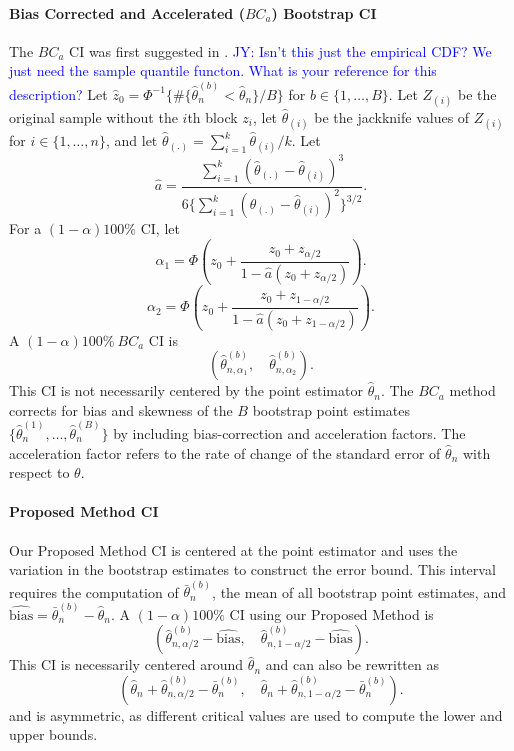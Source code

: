 \documentclass[12pt, letterpaper, titlepage]{article}
\newcommand{\jy}[1]{\textcolor{blue}{JY: #1}}
\begin{document}
\paragraph{Bias Corrected and Accelerated ($BC_a$) Bootstrap CI}
The $BC_a$ CI was first suggested in \citet{efron1987better}.
\jy{Isn't this just the empirical CDF? We just need the sample quantile functon.
  What is your reference for this description?}
Let $\hat{z}_0 = \Phi^{-1}\{\#\{\hat\theta_n^{(b)} < \hat{\theta}_n\} / B\}$
for $b \in \{1, \ldots, B\}$. 
Let $Z_{(i)}$ be the original sample without the $i$th block $z_i$, let
$\hat{\theta}_{(i)}$ be the jackknife values of $Z_{(i)}$
for $i \in \{1, \ldots, n\}$, 
and let $\hat{\theta}_{(.)} = \sum_{i=1}^{k} \hat{\theta}_{(i)} / k$. 
Let 
\[
\hat{a} = \frac{\sum_{i=1}^{k} (\hat{\theta}_{(.)} -
  \hat{\theta}_{(i)})^3}{6\{\sum_{i=1}^{k} (\hat{\theta}_{(.)} -
  \hat{\theta}_{(i)})^2\}^{3/2}}
.\] For a $(1 - \alpha)100\%$ CI, let
\[
\alpha_1 = \Phi\left(z_0 + \frac{z_{0} +
  z_{\alpha/2}}{1 - \hat{a}(z_{0} + z_{\alpha/2})}\right).
\]
\[
\alpha_2 = \Phi\left(z_0 + \frac{z_{0} +
  z_{1 - \alpha/2}}{1 - \hat{a}(z_{0} + z_{1 - \alpha/2})}\right).
\]
A $(1 - \alpha)100\%~BC_a$ CI is
\[
(\hat\theta_{n, \alpha_1}^{(b)}, \quad \hat\theta_{n, \alpha_2}^{(b)}).
\]
This CI is not necessarily centered by the point estimator $\hat\theta_n$. The
$BC_a$ method corrects for bias and skewness of the $B$ bootstrap point
estimates $\{\hat\theta_n^{(1)}, \ldots, \hat\theta_n^{(B)}\}$ by including
bias-correction and acceleration factors. The acceleration factor refers to
the 
rate of change of the standard error of $\hat\theta_n$ with respect to
$\theta$.

\paragraph{Proposed Method CI}
Our Proposed Method CI is centered at the point estimator and uses the
variation
in the bootstrap estimates to construct the error bound. This interval requires
the computation of $\bar\theta_n^{(b)}$, the mean of all bootstrap point
estimates, and $\widehat{\text{bias}} = \bar\theta_n^{(b)} - \hat\theta_n$.
A $(1 - \alpha)100\%$ CI using our Proposed Method is
\[
(\hat\theta_{n, \alpha/2}^{(b)} - \widehat{\text{bias}}, \quad
\hat\theta_{n, 1 - \alpha/2}^{(b)} - \widehat{\text{bias}}).
\]
This CI is necessarily centered around $\hat\theta_n$ and can also be rewritten
as 
\[
(\hat\theta_n + \hat\theta_{n, \alpha/2}^{(b)} - \bar\theta_n^{(b)}, \quad
\hat\theta_n + \hat\theta_{n, 1 - \alpha/2}^{(b)} - \bar\theta_n^{(b)}).
\]
and is asymmetric, as different critical values are used to compute
the lower and upper bounds.
\end{document}
